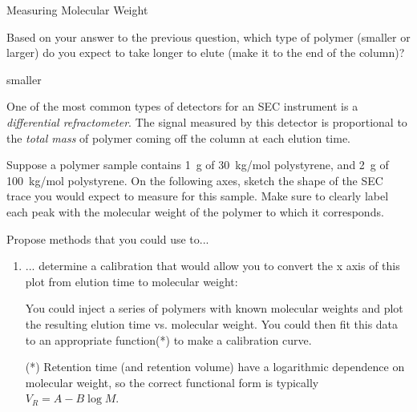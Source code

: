 \begin{activity}{Measuring Molecular Weight}
\begin{ctqs}
	\question Based on your answer to the previous question, which type of polymer (smaller or larger) do you expect to take longer to elute (make it to the end of the column)?
	
		\begin{solution}[0.5in]
			smaller
		\end{solution}
	
\end{ctqs}

\begin{infobox}
	One of the most common types of detectors for an SEC instrument is a \emph{differential refractometer}.  The signal measured by this detector is proportional to the \emph{total mass} of polymer coming off the column at each elution time.
\end{infobox}

\clearpage
\begin{ctqs}
	
	\question Suppose a polymer sample contains 1~g of 30~kg/mol polystyrene, and 2~g of 100~kg/mol polystyrene.  On the following axes, sketch the shape of the SEC trace you would expect to measure for this sample.  Make sure to clearly label each peak with the molecular weight of the polymer to which it corresponds.
	
		\begin{solution}[2in]
		\end{solution}
	
	\question Propose methods that you could use to...
	
		\begin{enumerate}
			\item ... determine a calibration that would allow you to convert the x axis of this plot from elution time to molecular weight:
	
				\begin{solution}[1in]
					You could inject a series of polymers with known molecular weights and plot the resulting elution time vs. molecular weight.  You could then fit this data to an appropriate function(*) to make a calibration curve.
					
					(*) Retention time (and retention volume) have a logarithmic dependence on molecular weight, so the correct functional form is typically $V_R = A - B \log M$.
					

\end{solution}
\end{enumerate}
\end{ctqs}
\end{activity}
